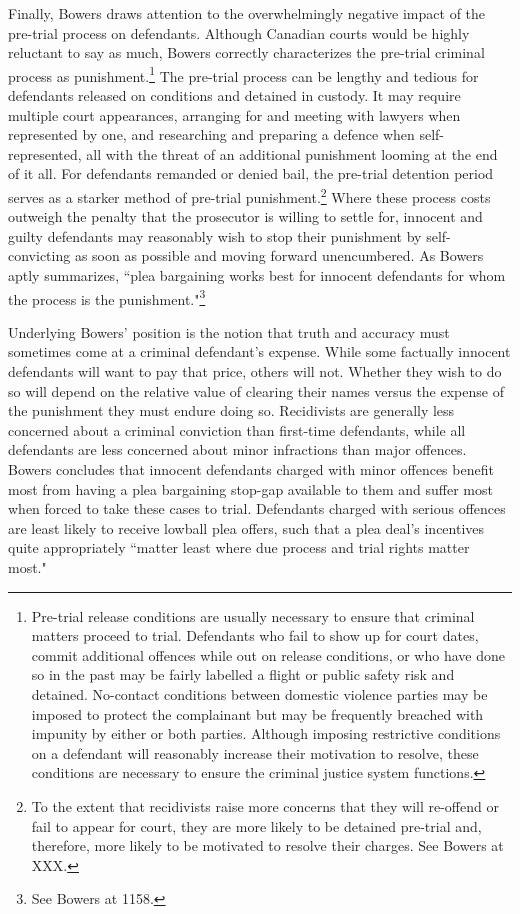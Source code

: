 Finally, Bowers draws attention to the overwhelmingly negative impact of the pre-trial process on defendants. Although Canadian courts would be highly reluctant to say as much, Bowers correctly characterizes the pre-trial criminal process as punishment.\footnote{Pre-trial release conditions are usually necessary to ensure that criminal matters proceed to trial. Defendants who fail to show up for court dates, commit additional offences while out on release conditions, or who have done so in the past may be fairly labelled a flight or public safety risk and detained. No-contact conditions between domestic violence parties may be imposed to protect the complainant but may be frequently breached with impunity by either or both parties. Although imposing restrictive conditions on a defendant will reasonably increase their motivation to resolve, these conditions are necessary to ensure the criminal justice system functions.} The pre-trial process can be lengthy and tedious for defendants released on conditions and detained in custody. It may require multiple court appearances, arranging for and meeting with lawyers when represented by one, and researching and preparing a defence when self-represented, all with the threat of an additional punishment looming at the end of it all. For defendants remanded or denied bail, the pre-trial detention period serves as a starker method of pre-trial punishment.\footnote{To the extent that recidivists raise more concerns that they will re-offend or fail to appear for court, they are more likely to be detained pre-trial and, therefore, more likely to be motivated to resolve their charges. See Bowers at XXX.} Where these process costs outweigh the penalty that the prosecutor is willing to settle for, innocent and guilty defendants may reasonably wish to stop their punishment by self-convicting as soon as possible and moving forward unencumbered. As Bowers aptly summarizes, ``plea bargaining works best for innocent defendants for whom the process is the punishment."\footnote{See Bowers at 1158.}

Underlying Bowers' position is the notion that truth and accuracy must sometimes come at a criminal defendant's expense. While some factually innocent defendants will want to pay that price, others will not. Whether they wish to do so will depend on the relative value of clearing their names versus the expense of the punishment they must endure doing so. Recidivists are generally less concerned about a criminal conviction than first-time defendants, while all defendants are less concerned about minor infractions than major offences. Bowers concludes that innocent defendants charged with minor offences benefit most from having a plea bargaining stop-gap available to them and suffer most when forced to take these cases to trial. Defendants charged with serious offences are least likely to receive lowball plea offers, such that a plea deal's incentives quite appropriately ``matter least where due process and trial rights matter most." 

